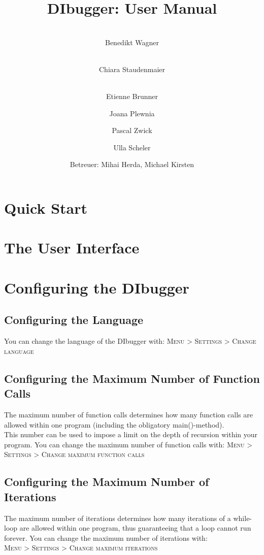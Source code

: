 \documentclass[parskip=full]{memoir}
\title{
	\vspace{2cm}
	\myfont 
	DIbugger: User Manual\\
}
\author{
	\vspace{1cm} \\
	Benedikt Wagner\\
	\and
	\vspace{1cm} \\ Chiara Staudenmaier\\
	\and 
		\vspace{1cm} \\
		Etienne Brunner\\
	\and Joana Plewnia\\
	\and Pascal Zwick\\
	\and Ulla Scheler\\
	\vspace{1cm}
	\and Betreuer: Mihai Herda, Michael Kirsten
	\vspace{4cm}
}
\begin{document}
\clearpage
\maketitle
{}
\newpage

\tableofcontents
\newpage
{}

\chapter{Quick Start} %
\chapter{The User Interface} %

\chapter{Configuring the DIbugger} %
\section{Configuring the Language}
You can change the language of the DIbugger with:
\textsc{Menu > Settings > Change language}

\section{Configuring the Maximum Number of Function Calls}
The maximum number of function calls determines how many function calls are allowed within one program (including the obligatory main()-method). \\
This number can be used to impose a limit on the depth of recursion within your program.
You can change the maximum number of function calls with:
\textsc{Menu > Settings > Change maximum function calls}
\section{Configuring the Maximum Number of Iterations}
The maximum number of iterations determines how many iterations of a while-loop are allowed within one program, thus guaranteeing that a loop cannot run forever.
You can change the maximum number of iterations with: \\
\textsc{Menu > Settings > Change maximum iterations}
\end{document}
